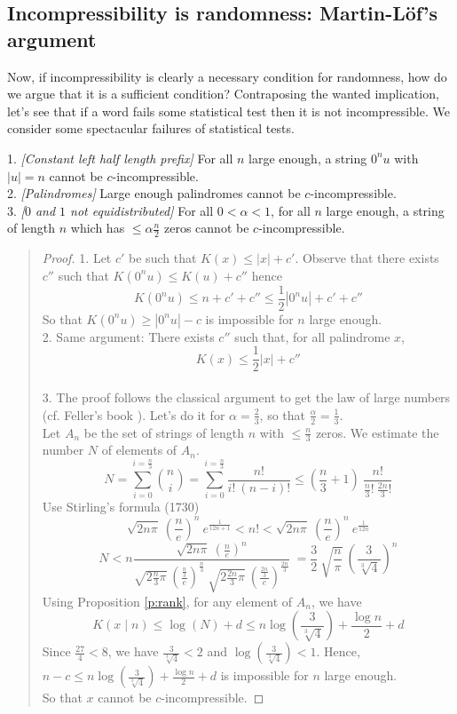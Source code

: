 \subsection{Incompressibility is randomness: Martin-L\"{o}f's argument}
\label{ss:tests}
Now, if incompressibility is clearly a necessary condition for
randomness, how do we argue that it is a sufficient condition?
Contraposing the wanted implication, let's see that if a word
fails some statistical test then it is not incompressible.
We consider some spectacular failures of statistical tests.
\begin{example}\label{ex:ex1}
1. {\em [Constant left half length prefix]}
For all $n$ large enough, a string $0^nu$
with $|u|=n$ cannot be $c$-incompressible.
\medskip\\
2. {\em [Palindromes]}
Large enough palindromes cannot be
$c$-incompressible.
\medskip\\
3. {\em [$0$ and $1$ not equidistributed]}
For all $0<\alpha<1$, for all $n$ large enough,
a string of length $n$ which has $\leq \alpha\frac{n}{2}$ zeros
cannot be $c$-incompressible.
\end{example}
{\small\begin{quote}
\begin{proof}
1. Let $c'$ be such that $K(x)\leq|x|+c'$.
Observe that there exists $c''$ such that $K(0^nu) \leq K(u)+c''$
hence
$$
K(0^nu)\leq n+c'+c'' \leq \frac{1}{2}|0^nu|+c'+c''
$$
So that $K(0^nu)\geq|0^nu|-c$ is impossible for $n$ large enough.
\medskip\\
2. Same argument:
There exists $c''$ such that, for all palindrome $x$,
$$
K(x)\leq \frac{1}{2}|x| + c''
$$
\medskip\\
3. The proof follows the classical argument to get the law
of large numbers (cf. Feller's book \cite{feller}).
Let's do it for $\alpha=\frac{2}{3}$, so that
$\frac{\alpha}{2}=\frac{1}{3}$.
\medskip\\
Let $A_n$ be the set of strings of length $n$ with
$\leq \frac{n}{3}$ zeros.
We estimate the number $N$ of elements of $A_n$.
$$
N=\sum_{i=0}^{i=\frac{n}{3}} \binom{n}{i}
=\sum_{i=0}^{i=\frac{n}{3}} \frac{n!}{i!\ (n-i)!}
\leq (\frac{n}{3}+1)\ \frac{n!}{\frac{n}{3}!\ \frac{2n}{3}!}
$$
Use Stirling's formula (1730)
$$
\sqrt{2n\pi}\ {\left(\frac{n}{e}\right)}^n\ e^{\frac{1}{12n+1}}
< n!
< \sqrt{2n\pi}\ {\left(\frac{n}{e}\right)}^n\ e^{\frac{1}{12n}}
$$
$$
N < n \frac{\sqrt{2n\pi}\ {\left(\frac{n}{e}\right)}^n}
{\sqrt{2\frac{n}{3}\pi}\
{\left(\frac{\frac{n}{3}}{e}\right)}^{\frac{n}{3}}\
\sqrt{2\frac{2n}{3}\pi}\
{\left(\frac{\frac{2n}{3}}{e}\right)}^{\frac{2n}{3}}}\
= \frac{3}{2}\
  \sqrt{\frac{n}{\pi}}\ {\left(\frac{3}{\sqrt[3]{4}}\right)}^n
$$
Using Proposition \ref{p:rank}, for any element of $A_n$, we have
$$
K(x\mid n)
\leq \log(N) +d
\leq n\log\left(\frac{3}{\sqrt[3]{4}}\right) + \frac{\log n}{2} + d
$$
Since $\frac{27}{4} < 8$, we have $\frac{3}{\sqrt[3]{4}} < 2$
and $\log\left(\frac{3}{\sqrt[3]{4}}\right) < 1$.
Hence,
$n-c \leq n\log\left(\frac{3}{\sqrt[3]{4}}\right)+\frac{\log n}{2}+d$
is impossible for $n$ large enough.
\\
So that $x$ cannot be $c$-incompressible.
\end{proof}
\end{quote}}
